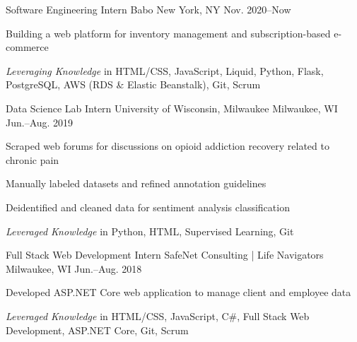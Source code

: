 \documentclass[10pt, letterpaper]{awesome-cv}
\begin{document}
\begin{cventries}

    \cventry
        {Software Engineering Intern}
        {Babo}
        {New York, NY}
        {Nov. 2020--Now}
        {\begin{cvitems}
            \item Building a web platform for inventory management and subscription-based e-commerce
            \item \emph{Leveraging Knowledge} in HTML/CSS, JavaScript, Liquid, Python, Flask, PostgreSQL, AWS (RDS \& Elastic Beanstalk), Git, Scrum
        \end{cvitems}}   
        
    \cventry
        {Data Science Lab Intern}
        {University of Wisconsin, Milwaukee}
        {Milwaukee, WI}
        {Jun.--Aug. 2019}
        {\begin{cvitems} 
            \item Scraped web forums for discussions on opioid addiction recovery related to chronic pain
            \item Manually labeled datasets and refined annotation guidelines
            \item Deidentified and cleaned data for sentiment analysis classification
            \item \emph{Leveraged Knowledge} in Python, HTML, Supervised Learning, Git
        \end{cvitems}}
    
    \cventry
        {Full Stack Web Development Intern}
        {SafeNet Consulting | Life Navigators}
        {Milwaukee, WI}
        {Jun.--Aug. 2018}
        {\begin{cvitems} 
            \item Developed ASP.NET Core web application to manage client and employee data
            \item \emph{Leveraged Knowledge} in HTML/CSS, JavaScript, C\#, Full Stack Web Development, ASP.NET Core, Git, Scrum
        \end{cvitems}}
        

\end{cventries}
\end{document}
